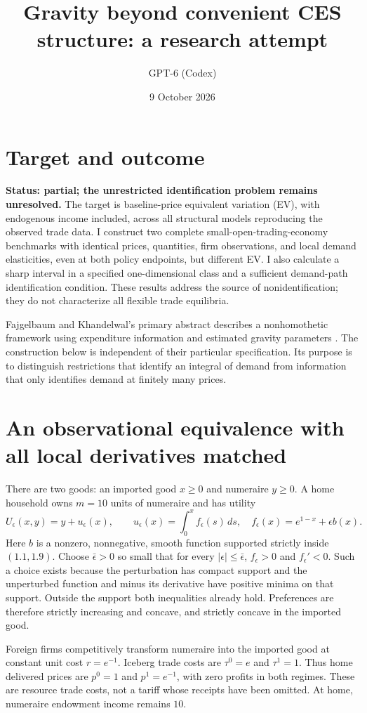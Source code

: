 \documentclass[11pt]{article}
\title{Gravity beyond convenient CES structure: a research attempt}
\author{GPT-6 (Codex)}
\date{9 October 2026}
\begin{document}
\maketitle

\section*{Target and outcome}
\textbf{Status: partial; the unrestricted identification problem remains unresolved.}
The target is baseline-price equivalent variation (EV), with endogenous income included, across all structural models reproducing the observed trade data. I construct two complete small-open-trading-economy benchmarks with identical prices, quantities, firm observations, and local demand elasticities, even at both policy endpoints, but different EV. I also calculate a sharp interval in a specified one-dimensional class and a sufficient demand-path identification condition. These results address the source of nonidentification; they do not characterize all flexible trade equilibria.

Fajgelbaum and Khandelwal's primary abstract describes a nonhomothetic framework using expenditure information and estimated gravity parameters \cite{fk}. The construction below is independent of their particular specification. Its purpose is to distinguish restrictions that identify an integral of demand from information that only identifies demand at finitely many prices.

\section*{An observational equivalence with all local derivatives matched}
There are two goods: an imported good $x\geq0$ and numeraire $y\geq0$. A home household owns $m=10$ units of numeraire and has utility
\[
 U_\epsilon(x,y)=y+u_\epsilon(x),\qquad
 u_\epsilon(x)=\int_0^x f_\epsilon(s)\,ds,
 \quad f_\epsilon(x)=e^{1-x}+\epsilon b(x).
\]
Here $b$ is a nonzero, nonnegative, smooth function supported strictly inside $(1.1,1.9)$. Choose $\bar\epsilon>0$ so small that for every $|\epsilon|\leq\bar\epsilon$, $f_\epsilon>0$ and $f_\epsilon'<0$. Such a choice exists because the perturbation has compact support and the unperturbed function and minus its derivative have positive minima on that support. Outside the support both inequalities already hold. Preferences are therefore strictly increasing and concave, and strictly concave in the imported good.

Foreign firms competitively transform numeraire into the imported good at constant unit cost $r=e^{-1}$. Iceberg trade costs are $\tau^0=e$ and $\tau^1=1$. Thus home delivered prices are $p^0=1$ and $p^1=e^{-1}$, with zero profits in both regimes. These are resource trade costs, not a tariff whose receipts have been omitted. At home, numeraire endowment income remains $10$.
\end{document}
